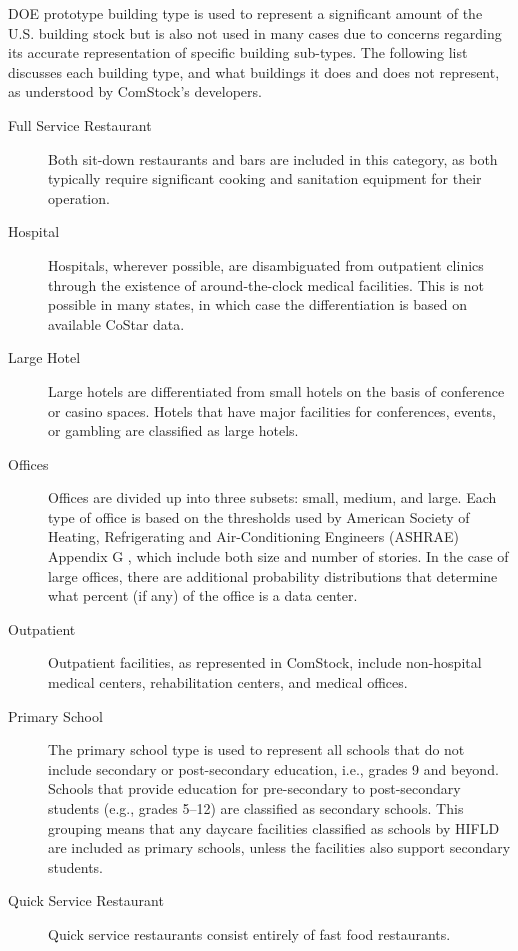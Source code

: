 DOE prototype building type is used to represent a significant amount of the U.S. building stock but is also not used in many cases due to concerns regarding its accurate representation of specific building sub-types. The following list discusses each building type, and what buildings it does and does not represent, as understood by ComStock's developers.

\newpage

\begin{description}
\item [Full Service Restaurant] Both sit-down restaurants and bars are included in this category, as both typically require significant cooking and sanitation equipment for their operation.
\item[Hospital] Hospitals, wherever possible, are disambiguated from outpatient clinics through the existence of around-the-clock medical facilities. This is not possible in many states, in which case the differentiation is based on available CoStar data.
\item[Large Hotel] Large hotels are differentiated from small hotels on the basis of conference or casino spaces. Hotels that have major facilities for conferences, events, or gambling are classified as large hotels.
\item[Offices] Offices are divided up into three subsets: small, medium, and large. Each type of office is based on the thresholds used by American Society of Heating, Refrigerating and Air-Conditioning Engineers (ASHRAE) Appendix G \citep{ashrae_901_2010}, which include both size and number of stories. In the case of large offices, there are additional probability distributions that determine what percent (if any) of the office is a data center.
\item[Outpatient] Outpatient facilities, as represented in ComStock, include non-hospital medical centers, rehabilitation centers, and medical offices.
\item[Primary School] The primary school type is used to represent all schools that do not include secondary or post-secondary education, i.e., grades 9 and beyond. Schools that provide education for pre-secondary to post-secondary students (e.g., grades 5--12) are classified as secondary schools. This grouping means that any daycare facilities classified as schools by HIFLD are included as primary schools, unless the facilities also support secondary students.
\item[Quick Service Restaurant] Quick service restaurants consist entirely of fast food restaurants.

\end{description}
